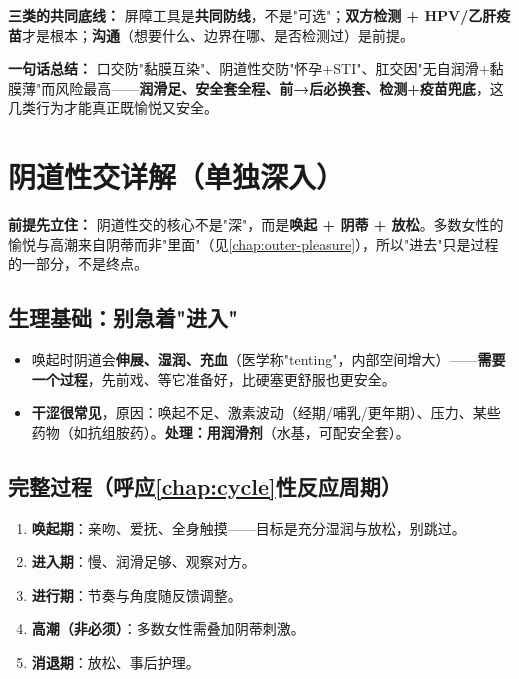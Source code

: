 \vspace{1em}
\noindent\textbf{三类的共同底线：} 屏障工具是\textbf{共同防线}，不是"可选"；\textbf{双方检测 + HPV/乙肝疫苗}才是根本；\textbf{沟通}（想要什么、边界在哪、是否检测过）是前提。

\noindent\textbf{一句话总结：} 口交防"黏膜互染"、阴道性交防"怀孕+STI"、肛交因"无自润滑+黏膜薄"而风险最高——\textbf{润滑足、安全套全程、前→后必换套、检测+疫苗兜底}，这几类行为才能真正既愉悦又安全。

\chapter{阴道性交详解（单独深入）}
\label{chap:vaginal}

\noindent\textbf{前提先立住：} 阴道性交的核心不是"深"，而是\textbf{唤起 + 阴蒂 + 放松}。多数女性的愉悦与高潮来自阴蒂而非"里面"（见\ref{chap:outer-pleasure}），所以"进去"只是过程的一部分，不是终点。

\section{生理基础：别急着"进入"}

\begin{itemize}[leftmargin=2em,itemsep=0.3em]
  \item 唤起时阴道会\textbf{伸展、湿润、充血}（医学称"tenting"，内部空间增大）——\textbf{需要一个过程}，先前戏、等它准备好，比硬塞更舒服也更安全。
  \item \textbf{干涩很常见}，原因：唤起不足、激素波动（经期/哺乳/更年期）、压力、某些药物（如抗组胺药）。\textbf{处理：用润滑剂}（水基，可配安全套）。
\end{itemize}

\section{完整过程（呼应\ref{chap:cycle}性反应周期）}

\begin{enumerate}[leftmargin=2em,itemsep=0.3em]
  \item \textbf{唤起期}：亲吻、爱抚、全身触摸——目标是充分湿润与放松，别跳过。
  \item \textbf{进入期}：慢、润滑足够、观察对方。
  \item \textbf{进行期}：节奏与角度随反馈调整。
  \item \textbf{高潮（非必须）}：多数女性需叠加阴蒂刺激。
  \item \textbf{消退期}：放松、事后护理。
\end{enumerate}

